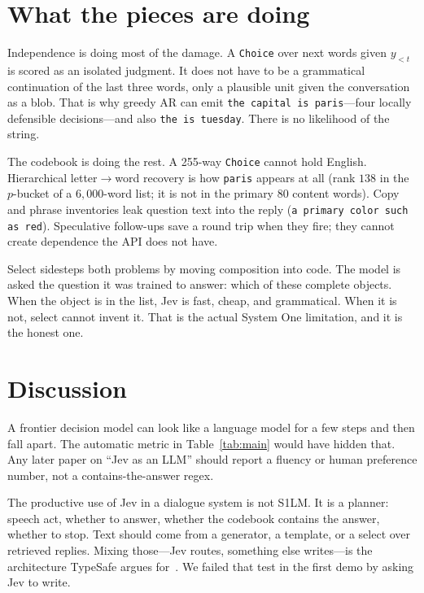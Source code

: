 \documentclass[11pt,twocolumn]{article}
\begin{document}
\section{What the pieces are doing}

Independence is doing most of the damage. A \texttt{Choice} over next words given $y_{<t}$ is scored as an isolated judgment. It does not have to be a grammatical continuation of the last three words, only a plausible unit given the conversation as a blob. That is why greedy AR can emit \texttt{the capital is paris}---four locally defensible decisions---and also \texttt{the is tuesday}. There is no likelihood of the string.

The codebook is doing the rest. A 255-way \texttt{Choice} cannot hold English. Hierarchical letter$\to$word recovery is how \texttt{paris} appears at all (rank $138$ in the $p$-bucket of a $6{,}000$-word list; it is not in the primary $80$ content words). Copy and phrase inventories leak question text into the reply (\texttt{a primary color such as red}). Speculative follow-ups save a round trip when they fire; they cannot create dependence the API does not have.

Select sidesteps both problems by moving composition into code. The model is asked the question it was trained to answer: which of these complete objects. When the object is in the list, Jev is fast, cheap, and grammatical. When it is not, select cannot invent it. That is the actual System One limitation, and it is the honest one.

\section{Discussion}

A frontier decision model can look like a language model for a few steps and then fall apart. The automatic metric in Table~\ref{tab:main} would have hidden that. Any later paper on ``Jev as an LLM'' should report a fluency or human preference number, not a contains-the-answer regex.

The productive use of Jev in a dialogue system is not S1LM. It is a planner: speech act, whether to answer, whether the codebook contains the answer, whether to stop. Text should come from a generator, a template, or a select over retrieved replies. Mixing those---Jev routes, something else writes---is the architecture TypeSafe argues for~\cite{typesafe2026docs}. We failed that test in the first demo by asking Jev to write.
\end{document}
